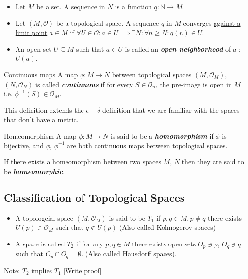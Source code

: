 \documentclass{article}
\begin{document}
\begin{mathdefinitionbox}{}
  \begin{itemize}
    \item Let $M$ be a set. A sequence in $N$ is a function $q : \mathbb{N} \rightarrow M$.
    \item Let $(M, \mathcal{O})$ be a topological space. A sequence $q$ in $M$ converges \underline{against a limit point} $a \in M$ if $\forall U \in \mathcal{O} : a \in U \implies \exists N : \forall n \geq N : q(n) \in U$.
    \item An open set $U \subseteq M$ such that $a \in U$ is called an \emph{\textbf{open neighborhood}} of $a$ : $U(a)$.
  \end{itemize}
\end{mathdefinitionbox}

\begin{mathdefinitionbox}{Continuous maps}
\vskip 0.5cm
  A map $\phi : M \rightarrow N$ between topological spaces $(M, \mathcal{O}_M)$, $(N, \mathcal{O}_N)$ is called \emph{\textbf{continuous}} if for every $S \in \mathcal{O}_n$, the pre-image is open in $M$ i.e. $\phi^{-1}(S) \in \mathcal{O}_M$.
\end{mathdefinitionbox}

This definition extends the $\epsilon-\delta$ definition that we are familiar with the spaces that don't have a metric.

\begin{mathdefinitionbox}{Homeomorphism}
  A map $\phi : M \rightarrow N$ is said to be a \emph{\textbf{homomorphism}} if $\phi$ is bijective, and $\phi$, $\phi^{-1}$ are both continuous maps between topological spaces.
  
  \vskip 0.5cm
  If there exists a homeomorphism between two spaces $M$, $N$ then they are said to be \emph{\textbf{homeomorphic}}. 
\end{mathdefinitionbox}

\vskip 0.5cm
\subsection{Classification of Topological Spaces}

\vskip 0.5cm
\begin{mathdefinitionbox}{}
\begin{itemize}
  \item  A topologcial space $(M, \mathcal{O}_M)$ is said to be \emph{\textbf{$T_1$}} if $p, q \in M, p \neq q$ there exists $U(p) \in \mathcal{O}_M$ such that $q \not\in U(p)$ (Also called Kolmogorov spaces)
  \item A space is called \emph{\textbf{$T_2$}} if for any $p, q \in M$ there exists open sets $O_p \ni p$, $O_q \ni q$ such that $O_p \cap O_q = \emptyset$. (Also called Hausdorff spaces). 
\end{itemize}
Note: $T_2$ implies $T_1$ [Write proof]
\end{mathdefinitionbox}
\end{document}
